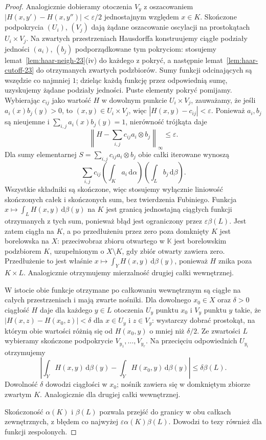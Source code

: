 \begin{proof}
Analogicznie dobieramy otoczenia $V_y$ z oszacowaniem
$|H(x,y')-H(x,y'')|<\varepsilon/2$ jednostajnym
względem $x\in K$. Skończone podpokrycia
$(U_i)$, $(V_j)$ dają żądane oszacowanie oscylacji
na prostokątach $U_i\times V_j$.
Na zwartych przestrzeniach Hausdorffa konstruujemy
ciągłe podziały jedności $(a_i)$, $(b_j)$ podporządkowane
tym pokryciom: stosujemy lemat~\ref{lem:haar-neigh-23}(iv)
do każdego z pokryć, a następnie lemat~\ref{lem:haar-cutoff-23}
do otrzymanych zwartych podzbiorów. Sumy funkcji odcinających
są wszędzie co najmniej $1$; dzieląc każdą funkcję przez
odpowiednią sumę, uzyskujemy żądane podziały jedności.
Puste elementy pokryć pomijamy. Wybierając
$c_{ij}$ jako wartość $H$ w dowolnym punkcie
$U_i\times V_j$, zauważamy, że jeśli
$a_i(x)b_j(y)>0$, to $(x,y)\in U_i\times V_j$,
więc $|H(x,y)-c_{ij}|<\varepsilon$.
Ponieważ $a_i,b_j$ są nieujemne i
$\sum_{i,j}a_i(x)b_j(y)=1$, nierówność trójkąta
daje
\[
 \left\|H-\sum_{i,j}c_{ij}a_i\otimes b_j\right\|_\infty
 \le\varepsilon.
\]
Dla sumy elementarnej $S=\sum_{i,j}c_{ij}a_i\otimes b_j$
obie całki iterowane wynoszą
\[
 \sum_{i,j}c_{ij}
       \left(\int_K a_i\,\mathrm d\alpha\right)
       \left(\int_L b_j\,\mathrm d\beta\right).
\]
Wszystkie składniki są skończone, więc stosujemy
wyłącznie liniowość skończonych całek i skończonych
sum, bez twierdzenia Fubiniego. Funkcja $x\mapsto\int_L H(x,y)\,\mathrm d\beta(y)$
na $K$ jest granicą jednostajną ciągłych funkcji otrzymanych
z tych sum, ponieważ błąd jest ograniczony przez
$\varepsilon\beta(L)$. Jest zatem ciągła na $K$,
a po przedłużeniu przez zero poza domknięty $K$ jest
borelowska na $X$: przeciwobraz zbioru otwartego
w $\mathbb K$ jest borelowskim podzbiorem $K$,
uzupełnionym o $X\setminus K$, gdy zbiór otwarty
zawiera zero. Przedłużenie to jest właśnie
$x\mapsto\int_Y H(x,y)\,\mathrm d\beta(y)$,
ponieważ $H$ znika poza $K\times L$. Analogicznie otrzymujemy mierzalność
drugiej całki wewnętrznej.

W istocie obie funkcje otrzymane po całkowaniu
wewnętrznym są ciągłe na całych przestrzeniach
i mają zwarte nośniki. Dla dowolnego $x_0\in X$
oraz $\delta>0$ ciągłość $H$ daje dla każdego
$y\in L$ otoczenia $U_y$ punktu $x_0$ i $V_y$
punktu $y$ takie, że
$|H(x,z)-H(x_0,z)|<\delta$ dla $x\in U_y$ i $z\in V_y$:
wystarczy dobrać prostokąt, na którym obie wartości
różnią się od $H(x_0,y)$ o mniej niż $\delta/2$.
Ze zwartości $L$ wybieramy skończone podpokrycie
$V_{y_1},\dots,V_{y_r}$. Na przecięciu odpowiednich
$U_{y_i}$ otrzymujemy
\[
 \left|\int_Y H(x,y)\,\mathrm d\beta(y)
       -\int_Y H(x_0,y)\,\mathrm d\beta(y)\right|
 \le\delta\beta(L).
\]
Dowolność $\delta$ dowodzi ciągłości w $x_0$;
nośnik zawiera się w domkniętym zbiorze zwartym $K$.
Analogicznie dla drugiej całki wewnętrznej.

Skończoność $\alpha(K)$
i $\beta(L)$ pozwala przejść do granicy w obu całkach
zewnętrznych, z błędem co najwyżej $\varepsilon\alpha(K)\beta(L)$.
Dowodzi to tezy również dla funkcji zespolonych.
\end{proof}

